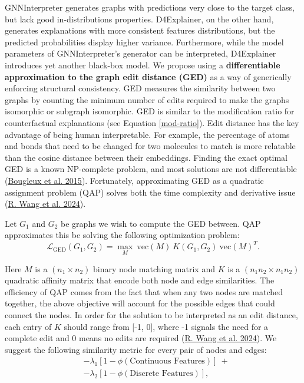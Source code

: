 \documentclass[
  11pt,
  letterpaper,
]{article}
\begin{document}
\quad GNNInterpreter generates graphs with predictions very close to the
target class, but lack good in-distributions properties. D4Explainer, on
the other hand, generates explanations with more consistent features
distributions, but the predicted probabilities display higher variance.
Furthermore, while the model parameters of GNNInterpreter's generator
can be interpreted, D4Explainer introduces yet another black-box model.
We propose using a \textbf{differentiable approximation to the graph
edit distance (GED)} as a way of generically enforcing structural
consistency. GED measures the similarity between two graphs by counting
the minimum number of edits required to make the graphs isomorphic or
subgraph isomorphic. GED is similar to the modification ratio for
counterfactual explanations (see Equation \ref{mod-ratio}). Edit
distance has the key advantage of being human interpretable. For
example, the percentage of atoms and bonds that need to be changed for
two molecules to match is more relatable than the cosine distance
between their embeddings. Finding the exact optimal GED is a known
NP-complete problem, and most solutions are not differentiable
(\protect\hyperlink{ref-Bougleux_Brun_Carletti_Foggia_Gauxfczuxe8re_Vento_2015}{Bougleux
et al. 2015}). Fortunately, approximating GED as a quadratic assignment
problem (QAP) solves both the time complexity and derivative issue
(\protect\hyperlink{ref-wang2024pygm}{R. Wang et al. 2024}).

\quad Let \(G_1\) and \(G_2\) be graphs we wish to compute the GED
between. QAP approximates this be solving the following optimization
problem: \begin{equation} \label{QAP-obj}
    \mathcal{L}_{\text{GED}}(G_1, G_2) = \underset{M}{\max} \ \text{vec}(M) \ K(G_1, G_2) \ \text{vec}(M)^T.
\end{equation}

Here \(M\) is a \((n_1 \times n_2)\) binary node matching matrix and
\(K\) is a \((n_1 n_2 \times n_1 n_2)\) quadratic affinity matrix that
encode both node and edge similarities. The efficiency of QAP comes from
the fact that when any two nodes are matched together, the above
objective will account for the possible edges that could connect the
nodes. In order for the solution to be interpreted as an edit distance,
each entry of \(K\) should range from {[}-1, 0{]}, where -1 signals the
need for a complete edit and 0 means no edits are required
(\protect\hyperlink{ref-wang2024pygm}{R. Wang et al. 2024}). We suggest
the following similarity metric for every pair of nodes and edges:
\begin{equation}
    \begin{split}
         &-\lambda_1 \left[ 1 - \phi(\text{Continuous Features}) \right] \ + \\
         &-\lambda_2 \left[1 - \phi(\text{Discrete Features}) \right], 
    \end{split}
\end{equation}
\end{document}
